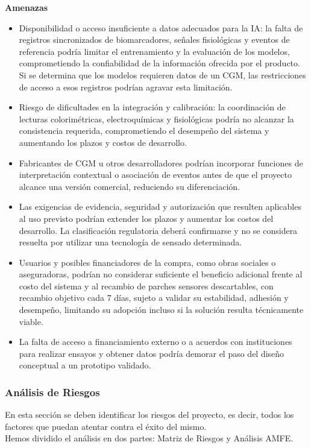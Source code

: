 \noindent\textbf{Amenazas}
\begin{itemize}
    \item Disponibilidad o acceso insuficiente a datos adecuados para la IA: la falta de registros sincronizados de biomarcadores, señales fisiológicas y eventos de referencia podría limitar el entrenamiento y la evaluación de los modelos, comprometiendo la confiabilidad de la información ofrecida por el producto. Si se determina que los modelos requieren datos de un CGM, las restricciones de acceso a esos registros podrían agravar esta limitación.
    \item Riesgo de dificultades en la integración y calibración: la coordinación de lecturas colorimétricas, electroquímicas y fisiológicas podría no alcanzar la consistencia requerida, comprometiendo el desempeño del sistema y aumentando los plazos y costos de desarrollo.
    \item Fabricantes de CGM u otros desarrolladores podrían incorporar funciones de interpretación contextual o asociación de eventos antes de que el proyecto alcance una versión comercial, reduciendo su diferenciación.
    \item Las exigencias de evidencia, seguridad y autorización que resulten aplicables al uso previsto podrían extender los plazos y aumentar los costos del desarrollo. La clasificación regulatoria deberá confirmarse y no se considera resuelta por utilizar una tecnología de sensado determinada.
    \item Usuarios y posibles financiadores de la compra, como obras sociales o aseguradoras, podrían no considerar suficiente el beneficio adicional frente al costo del sistema y al recambio de parches sensores descartables, con recambio objetivo cada 7 días, sujeto a validar su estabilidad, adhesión y desempeño, limitando su adopción incluso si la solución resulta técnicamente viable.
    \item La falta de acceso a financiamiento externo o a acuerdos con instituciones para realizar ensayos y obtener datos podría demorar el paso del diseño conceptual a un prototipo validado.
\end{itemize}




\subsubsection{Análisis de Riesgos}
{\consigna
En esta sección se deben identificar los riesgos del proyecto, es decir, todos los factores que puedan atentar contra el éxito del mismo.\\
Hemos dividido el análisis en dos partes: Matriz de Riesgos y Análisis AMFE.
}

